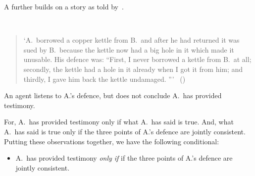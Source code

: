 \begin{note}
  A further  builds on a story as told by~\citeauthor{Freud:1960wx}.
  \begin{illustration}
    \label{illu:kettle}
    \mbox{ }
    \vspace{-\baselineskip}
    \begin{quote}
      `A.\ borrowed a copper kettle from B.\ and after he had returned it was sued by B.\ because the kettle now had a big hole in it which made it unusable.
      His defence was:
      ``First, I never borrowed a kettle from B.\ at all;
      secondly, the kettle had a hole in it already when I got it from him;
      and thirdly, I gave him back the kettle undamaged.%
      '''\newline
      \mbox{ }\hfill\mbox{(\citeyear[62]{Freud:1960wx})}
    \end{quote}
    An agent listens to A.'s defence, but does not conclude A.\ has provided testimony.
  \end{illustration}

  For, A.\ has provided testimony only if what A.\ has said is true.
  And, what A.\ has said is true only if the three points of A.'s defence are jointly consistent.
  Putting these observations together, we have the following conditional:

  \begin{itemize}
  \item
    A.\ has provided testimony \emph{only if} if the three points of A.'s defence are jointly consistent.
  \end{itemize}
\end{note}

